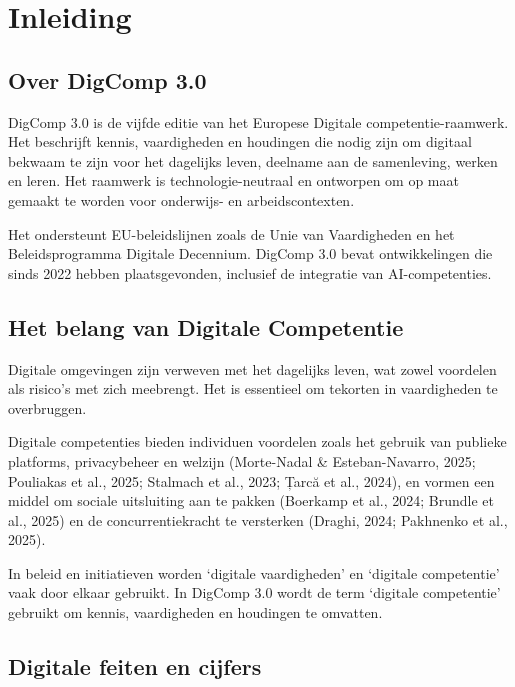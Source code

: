 \documentclass[
  dutch,
  letterpaper,
  DIV=11,
  numbers=noendperiod]{scrartcl}
\begin{document}
\newpage{}

\section{Inleiding}\label{sec-inleiding}

\subsection{Over DigComp 3.0}\label{sec-over-digcomp-3.0}

DigComp 3.0 is de vijfde editie van het Europese Digitale
competentie-raamwerk. Het beschrijft kennis, vaardigheden en houdingen
die nodig zijn om digitaal bekwaam te zijn voor het dagelijks leven,
deelname aan de samenleving, werken en leren. Het raamwerk is
technologie-neutraal en ontworpen om op maat gemaakt te worden voor
onderwijs- en arbeidscontexten.

Het ondersteunt EU-beleidslijnen zoals de Unie van Vaardigheden en het
Beleidsprogramma Digitale Decennium. DigComp 3.0 bevat ontwikkelingen
die sinds 2022 hebben plaatsgevonden, inclusief de integratie van
AI-competenties.

\subsection{Het belang van Digitale
Competentie}\label{het-belang-van-digitale-competentie}

Digitale omgevingen zijn verweven met het dagelijks leven, wat zowel
voordelen als risico's met zich meebrengt. Het is essentieel om tekorten
in vaardigheden te overbruggen.

Digitale competenties bieden individuen voordelen zoals het gebruik van
publieke platforms, privacybeheer en welzijn (Morte-Nadal \&
Esteban-Navarro, 2025; Pouliakas et al., 2025; Stalmach et al., 2023;
Țarcă et al., 2024), en vormen een middel om sociale uitsluiting aan te
pakken (Boerkamp et al., 2024; Brundle et al., 2025) en de
concurrentiekracht te versterken (Draghi, 2024; Pakhnenko et al., 2025).

In beleid en initiatieven worden `digitale vaardigheden' en `digitale
competentie' vaak door elkaar gebruikt. In DigComp 3.0 wordt de term
`digitale competentie' gebruikt om kennis, vaardigheden en houdingen te
omvatten.

\subsection{Digitale feiten en
cijfers}\label{digitale-feiten-en-cijfers}
\end{document}
